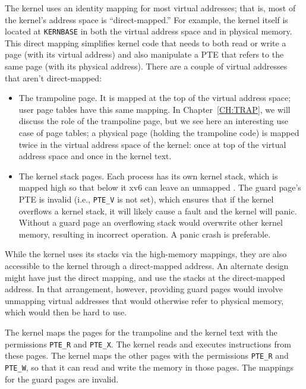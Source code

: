 The kernel uses an identity mapping for most virtual addresses; that
is, most of the kernel's address space is ``direct-mapped.'' For
example, the kernel itself is located at \lstinline{KERNBASE} in both
the virtual address space and in physical memory. This direct mapping
simplifies kernel code that needs to both read or write a page (with
its virtual address) and also manipulate a PTE that refers to the same
page (with its physical address). There are a couple of virtual
addresses that aren't direct-mapped:

\begin{itemize}
  
\item The trampoline page. It is mapped at the top of the virtual
  address space; user page tables have this same mapping.  In
  Chapter~\ref{CH:TRAP}, we will discuss the role of the trampoline
  page, but we see here an interesting use case of page tables; a
  physical page (holding the trampoline code) is mapped twice in the
  virtual address space of the kernel: once at top of the virtual
  address space and once in the kernel text.

\item The kernel stack pages.  Each process has its own kernel stack,
  which is mapped high so that below it xv6 can leave an unmapped .  The guard page's PTE is invalid (i.e.,
  \lstinline{PTE_V} is not set), which ensures that if the kernel overflows
  a kernel stack, it will likely cause a fault and the kernel will panic.
  Without a guard page an overflowing stack would overwrite other kernel memory,
  resulting in incorrect operation. A panic crash is preferable.

\end{itemize}

While the kernel uses its stacks via the high-memory mappings, they
are also accessible to the kernel through a direct-mapped address. An
alternate design might have just the direct mapping, and use the
stacks at the direct-mapped address. In that arrangement, however,
providing guard pages would involve unmapping virtual addresses that
would otherwise refer to physical memory, which would then be hard to
use.

The kernel maps the pages for the trampoline and the kernel text with
the permissions
\lstinline{PTE_R}
and
\lstinline{PTE_X}.
The kernel reads and executes instructions from these pages.
The kernel maps the other pages with the permissions
\lstinline{PTE_R}
and
\lstinline{PTE_W},
so that it can read and write the memory in those pages.
The mappings for the guard pages are invalid.


